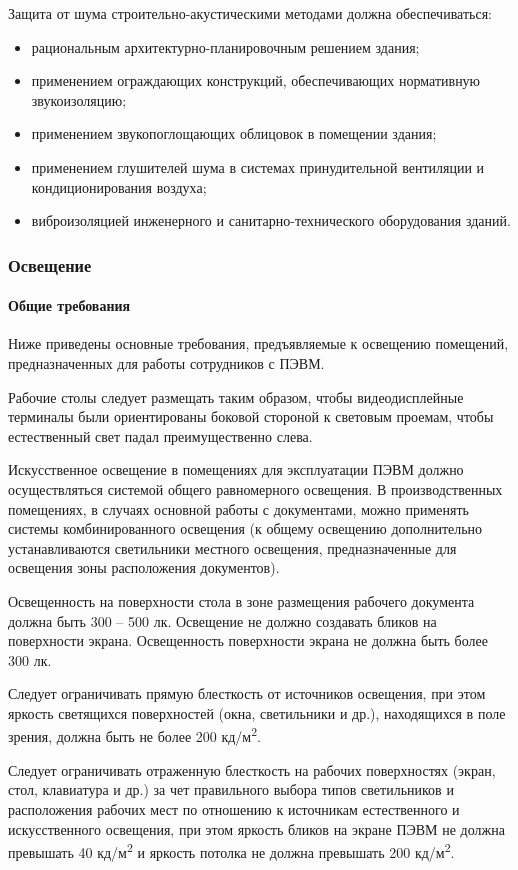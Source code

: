 Защита от шума строительно-акустическими методами должна обеспечиваться:
\begin{itemize}
\item рациональным архитектурно-планировочным решением здания;
\item применением ограждающих конструкций, обеспечивающих нормативную звукоизоляцию;
\item применением звукопоглощающих облицовок в помещении здания;
\item применением глушителей шума в системах принудительной вентиляции и кондиционирования воздуха;
\item виброизоляцией инженерного и санитарно-технического оборудования зданий.
\end{itemize}

\subsubsection{Освещение}
\paragraph{Общие требования}

Ниже приведены основные требования, предъявляемые к освещению помещений, предназначенных для работы сотрудников с ПЭВМ.

Рабочие столы следует размещать таким образом, чтобы видеодисплейные терминалы были ориентированы боковой стороной к световым проемам, чтобы естественный свет падал преимущественно слева.

Искусственное освещение в помещениях для эксплуатации ПЭВМ должно осуществляться системой общего равномерного освещения. В производственных помещениях, в случаях основной работы с документами, можно применять системы комбинированного освещения (к общему освещению дополнительно устанавливаются светильники местного освещения, предназначенные для освещения зоны расположения документов).

Освещенность на поверхности стола в зоне размещения рабочего документа должна быть 300 – 500 лк. Освещение не должно создавать бликов на поверхности экрана. Освещенность поверхности экрана не должна быть более 300 лк.

Следует ограничивать прямую блесткость от источников освещения, при этом яркость светящихся поверхностей (окна, светильники и др.), находящихся в поле зрения, должна быть не более 200 кд/м\textsuperscript{2}.

Следует ограничивать отраженную блесткость на рабочих поверхностях (экран, стол, клавиатура и др.) за чет правильного выбора типов светильников и расположения рабочих мест по отношению к источникам естественного и искусственного освещения, при этом яркость бликов на экране ПЭВМ не должна превышать 40 кд/м\textsuperscript{2} и яркость потолка не должна превышать 200 кд/м\textsuperscript{2}.

